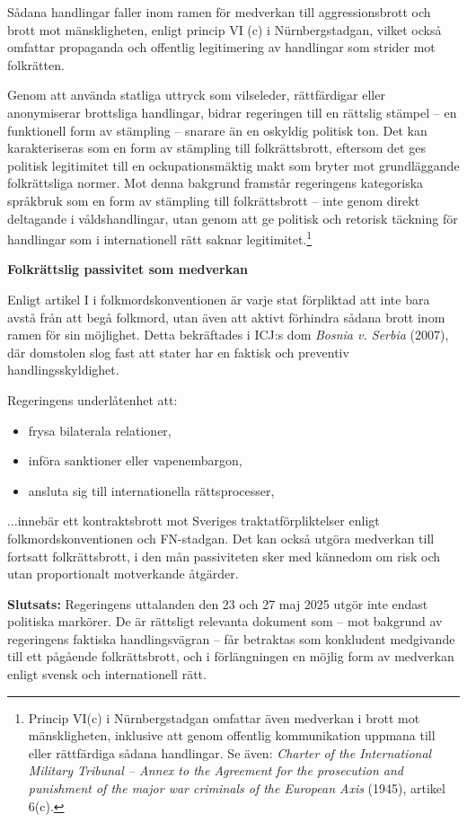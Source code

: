 Sådana handlingar faller inom ramen för medverkan till aggressionsbrott och brott mot mänskligheten, enligt princip VI (c) i Nürnbergstadgan, 
vilket också omfattar propaganda och offentlig legitimering av handlingar som strider mot folkrätten.

Genom att använda statliga uttryck som vilseleder, rättfärdigar eller anonymiserar brottsliga handlingar, bidrar regeringen till en 
rättslig stämpel – en funktionell form av stämpling – snarare än en oskyldig politisk ton. 
Det kan karakteriseras som en form av stämpling till folkrättsbrott, eftersom det ges politisk legitimitet 
till en ockupationsmäktig makt som bryter mot grundläggande folkrättsliga normer.
Mot denna bakgrund framstår regeringens kategoriska språkbruk som en form av stämpling till 
folkrättsbrott – inte genom direkt deltagande i våldshandlingar, utan genom att ge politisk och retorisk 
täckning för handlingar som i internationell rätt saknar legitimitet.\footnote{Princip VI(c) i Nürnbergstadgan omfattar även medverkan i brott mot mänskligheten, inklusive att genom offentlig kommunikation uppmana till eller rättfärdiga sådana handlingar. Se även: \textit{Charter of the International Military Tribunal – Annex to the Agreement for the prosecution and punishment of the major war criminals of the European Axis} (1945), artikel 6(c).}





\textbf{Folkrättslig passivitet som medverkan}

Enligt artikel I i folkmordskonventionen är varje stat förpliktad att inte bara avstå från att begå folkmord, utan även att aktivt förhindra sådana brott inom ramen för sin möjlighet. Detta bekräftades i ICJ:s dom \textit{Bosnia v. Serbia} (2007), där domstolen slog fast att stater har en faktisk och preventiv handlingsskyldighet.

Regeringens underlåtenhet att:

\begin{itemize}
    \item frysa bilaterala relationer,
    \item införa sanktioner eller vapenembargon,
    \item ansluta sig till internationella rättsprocesser,
\end{itemize}

...innebär ett kontraktsbrott mot Sveriges traktatförpliktelser enligt folkmordskonventionen och FN-stadgan. Det kan också utgöra medverkan till fortsatt folkrättsbrott, i den mån passiviteten sker med kännedom om risk och utan proportionalt motverkande åtgärder.

\medskip

\textbf{Slutsats:} Regeringens uttalanden den 23 och 27 maj 2025 utgör inte endast politiska markörer. De är rättsligt relevanta dokument som – mot bakgrund av regeringens faktiska handlingsvägran – får betraktas som konkludent medgivande till ett pågående folkrättsbrott, och i förlängningen en möjlig form av medverkan enligt svensk och internationell rätt.
